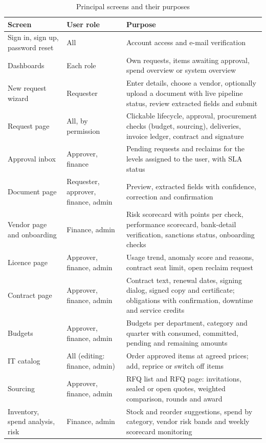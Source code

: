 \begin{table}[H]
\centering\tablestyle
\caption{Principal screens and their purposes}\label{tab:screens}
\begin{tabularx}{\textwidth}{|L{0.22\textwidth}|L{0.20\textwidth}|Y|}
\hline
\textbf{Screen} & \textbf{User role} & \textbf{Purpose} \\ \hline
Sign in, sign up, password reset & All & Account access and e-mail verification \\ \hline
Dashboards & Each role & Own requests, items awaiting approval, spend overview or system overview \\ \hline
New request wizard & Requester & Enter details, choose a vendor, optionally upload a document with live pipeline status, review extracted fields and submit \\ \hline
Request page & All, by permission & Clickable lifecycle, approval, procurement checks (budget, sourcing), deliveries, invoice ledger, contract and signature \\ \hline
Approval inbox & Approver, finance & Pending requests and reclaims for the levels assigned to the user, with SLA status \\ \hline
Document page & Requester, approver, finance, admin & Preview, extracted fields with confidence, correction and confirmation \\ \hline
Vendor page and onboarding & Finance, admin & Risk scorecard with points per check, performance scorecard, bank-detail verification, sanctions status, onboarding checks \\ \hline
Licence page & Approver, finance, admin & Usage trend, anomaly score and reasons, contract seat limit, open reclaim request \\ \hline
Contract page & Approver, finance, admin & Contract text, renewal dates, signing dialog, signed copy and certificate; obligations with confirmation, downtime and service credits \\ \hline
Budgets & Approver, finance, admin & Budgets per department, category and quarter with consumed, committed, pending and remaining amounts \\ \hline
IT catalog & All (editing: finance, admin) & Order approved items at agreed prices; add, reprice or switch off items \\ \hline
Sourcing & Approver, finance, admin & RFQ list and RFQ page: invitations, sealed or open quotes, weighted comparison, rounds and award \\ \hline
Inventory, spend analysis, risk & Finance, admin & Stock and reorder suggestions, spend by category, vendor risk bands and weekly scorecard monitoring \\ \hline

\end{tabularx}
\end{table}
